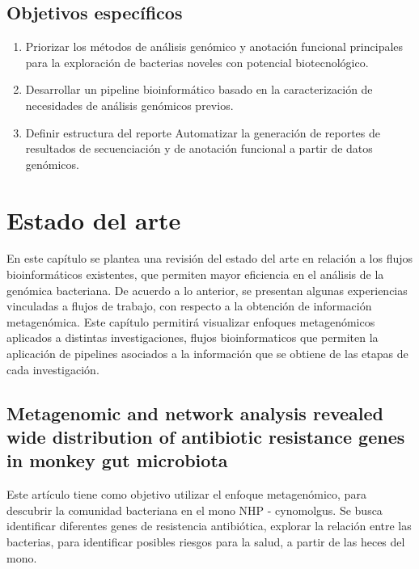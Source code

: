 \documentclass[12pt]{article}
\begin{document}
\subsection{Objetivos específicos}
\begin{enumerate}
    \item Priorizar los métodos de análisis genómico y anotación funcional principales para la exploración de bacterias noveles con potencial biotecnológico.
    \item Desarrollar un pipeline bioinformático basado en la caracterización de necesidades de análisis genómicos previos.
    \item Definir estructura del reporte Automatizar la generación de reportes de resultados de secuenciación y de anotación funcional a partir de datos genómicos.
\end{enumerate}


\newpage
\section{Estado del arte}
En este  capítulo se plantea una revisión del estado del arte en relación a los flujos bioinformáticos existentes, que permiten mayor eficiencia en el análisis de la genómica bacteriana.
De acuerdo a lo anterior, se presentan algunas experiencias vinculadas a flujos de trabajo, con respecto  a la obtención de información metagenómica.
Este capítulo permitirá visualizar enfoques metagenómicos aplicados a distintas investigaciones, flujos bioinformaticos que permiten la aplicación de pipelines asociados a  la información que se obtiene de las etapas de cada investigación.

\subsection*{Metagenomic and network analysis revealed wide distribution of antibiotic resistance genes in monkey gut microbiota}
Este artículo tiene como objetivo utilizar el enfoque metagenómico, para descubrir la comunidad bacteriana en el mono NHP - cynomolgus. Se busca identificar diferentes genes de resistencia antibiótica, explorar la relación entre las bacterias, para identificar posibles riesgos para la salud, a partir de las heces del mono.
\end{document}
